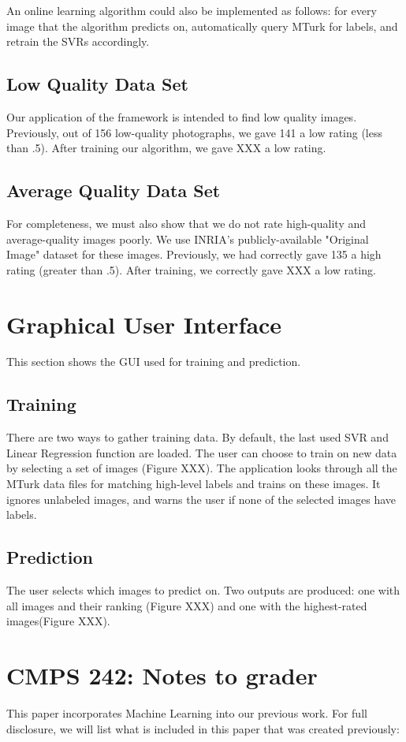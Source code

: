 \documentclass[11pt,letter]{article}
\begin{document}
An online learning algorithm could also be implemented as follows: for every image that the algorithm predicts on, automatically query MTurk for labels, and retrain the SVRs accordingly.

\subsection{Low Quality Data Set}
Our application of the framework is intended to find low quality images. Previously, out of 156 low-quality photographs, we gave 141 a low rating (less than .5). After training our algorithm, we gave XXX a low rating.

\subsection{Average Quality Data Set}
For completeness, we must also show that we do not rate high-quality and average-quality images poorly. We use INRIA's publicly-available "Original Image" dataset\cite{JDS08} for these images. Previously, we had correctly gave 135 a high rating (greater than .5). After training, we correctly gave XXX a low rating.

\appendix
\section{Graphical User Interface}
This section shows the GUI used for training and prediction.

\subsection{Training}
There are two ways to gather training data. By default, the last used SVR and Linear Regression function are loaded. The user can choose to train on new data by selecting a set of images (Figure XXX). The application looks through all the MTurk data files for matching high-level labels and trains on these images. It ignores unlabeled images, and warns the user if none of the selected images have labels.

\subsection{Prediction}
The user selects which images to predict on. Two outputs are produced: one with all images and their ranking (Figure XXX) and one with the highest-rated images(Figure XXX).

\section{CMPS 242: Notes to grader}
This paper incorporates Machine Learning into our previous work. For full disclosure, we will list what is included in this paper that was created previously:
\end{document}
